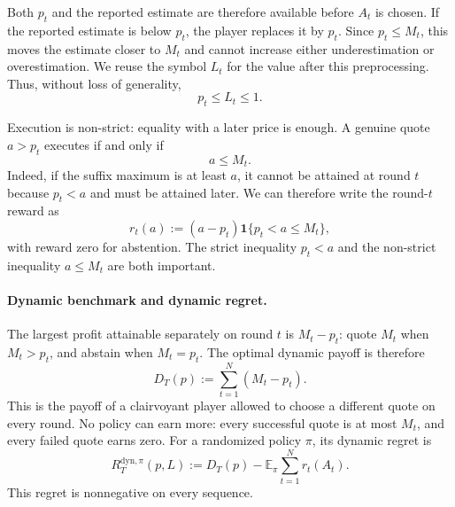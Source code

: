 \documentclass[11pt]{article}
\theoremstyle{remark}
\newcommand{\E}{\mathbb E}
\newcommand{\ind}{\mathbf 1}
\begin{document}
Both $p_t$ and the reported estimate are therefore available before $A_t$
is chosen.  If the reported estimate is below $p_t$, the player replaces it
by $p_t$.  Since $p_t\le M_t$, this moves the estimate closer to $M_t$ and
cannot increase either underestimation or overestimation.  We reuse the
symbol $L_t$ for the value after this preprocessing.  Thus, without loss of
generality,
\begin{equation}\label{eq:estimate-normalization}
  p_t\le L_t\le1.
\end{equation}

Execution is non-strict: equality with a later price is enough.  A genuine
quote $a>p_t$ executes if and only if
\begin{equation}\label{eq:threshold-equivalence}
  a\le M_t.
\end{equation}
Indeed, if the suffix maximum is at least $a$, it cannot be attained at
round $t$ because $p_t<a$ and must be attained later.  We can therefore write
the round-$t$ reward as
\begin{equation}\label{eq:reward}
  r_t(a):=(a-p_t)\ind\{p_t<a\le M_t\},
\end{equation}
with reward zero for abstention.  The strict inequality $p_t<a$ and the
non-strict inequality $a\le M_t$ are both important.

\paragraph{Dynamic benchmark and dynamic regret.}
The largest profit attainable separately on round $t$ is $M_t-p_t$: quote
$M_t$ when $M_t>p_t$, and abstain when $M_t=p_t$.  The optimal dynamic
payoff is therefore
\begin{equation}\label{eq:dynamic-payoff}
  D_T(p):=\sum_{t=1}^{N}(M_t-p_t).
\end{equation}
This is the payoff of a clairvoyant player allowed to choose a different
quote on every round.  No policy can earn more: every successful quote is at
most $M_t$, and every failed quote earns zero.  For a randomized policy
$\pi$, its dynamic regret is
\begin{equation}\label{eq:dynamic-regret}
  R_T^{\mathrm{dyn},\pi}(p,L)
  :=D_T(p)-\E_\pi\sum_{t=1}^{N}r_t(A_t).
\end{equation}
This regret is nonnegative on every sequence.
\end{document}
